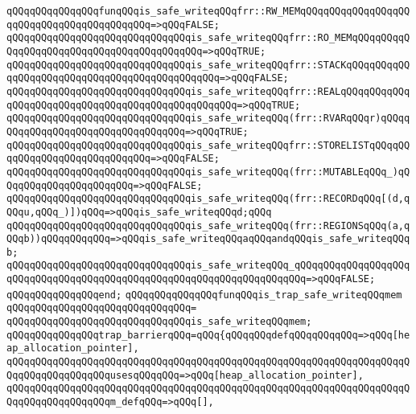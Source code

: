 \newline
\verb|qQQqqQQqqQQqqQQqfunqQQqis_safe_writeqQQqfrr::RW_MEMqQQqqQQqqQQqqQQqqQQqqQQqqQQqqQQqqQQqqQQqqQQq=>qQQqFALSE;|\newline
\verb|qQQqqQQqqQQqqQQqqQQqqQQqqQQqqQQqis_safe_writeqQQqfrr::RO_MEMqQQqqQQqqQQqqQQqqQQqqQQqqQQqqQQqqQQqqQQqqQQq=>qQQqTRUE;|\newline
\verb|qQQqqQQqqQQqqQQqqQQqqQQqqQQqqQQqis_safe_writeqQQqfrr::STACKqQQqqQQqqQQqqQQqqQQqqQQqqQQqqQQqqQQqqQQqqQQqqQQq=>qQQqFALSE;|\newline
\verb|qQQqqQQqqQQqqQQqqQQqqQQqqQQqqQQqis_safe_writeqQQqfrr::REALqQQqqQQqqQQqqQQqqQQqqQQqqQQqqQQqqQQqqQQqqQQqqQQqqQQq=>qQQqTRUE;|\newline
\verb|qQQqqQQqqQQqqQQqqQQqqQQqqQQqqQQqis_safe_writeqQQq(frr::RVARqQQqr)qQQqqQQqqQQqqQQqqQQqqQQqqQQqqQQqqQQq=>qQQqTRUE;|\newline
\verb|qQQqqQQqqQQqqQQqqQQqqQQqqQQqqQQqis_safe_writeqQQqfrr::STORELISTqQQqqQQqqQQqqQQqqQQqqQQqqQQqqQQq=>qQQqFALSE;|\newline
\verb|qQQqqQQqqQQqqQQqqQQqqQQqqQQqqQQqis_safe_writeqQQq(frr::MUTABLEqQQq_)qQQqqQQqqQQqqQQqqQQqqQQq=>qQQqFALSE;|\newline
\verb|qQQqqQQqqQQqqQQqqQQqqQQqqQQqqQQqis_safe_writeqQQq(frr::RECORDqQQq[(d,qQQqu,qQQq_)])qQQq=>qQQqis_safe_writeqQQqd;qQQq|\newline
\verb|qQQqqQQqqQQqqQQqqQQqqQQqqQQqqQQqis_safe_writeqQQq(frr::REGIONSqQQq(a,qQQqb))qQQqqQQqqQQq=>qQQqis_safe_writeqQQqaqQQqandqQQqis_safe_writeqQQqb;|\newline
\verb|qQQqqQQqqQQqqQQqqQQqqQQqqQQqqQQqis_safe_writeqQQq_qQQqqQQqqQQqqQQqqQQqqQQqqQQqqQQqqQQqqQQqqQQqqQQqqQQqqQQqqQQqqQQqqQQqqQQq=>qQQqFALSE;|\newline
\verb|qQQqqQQqqQQqqQQqend;|\newline
\newline
\verb|qQQqqQQqqQQqqQQqfunqQQqis_trap_safe_writeqQQqmem|\newline
\verb|qQQqqQQqqQQqqQQqqQQqqQQqqQQqqQQq=|\newline
\verb|qQQqqQQqqQQqqQQqqQQqqQQqqQQqqQQqis_safe_writeqQQqmem;|\newline
\newline
\verb|qQQqqQQqqQQqqQQqtrap_barrierqQQq=qQQq{qQQqqQQqdefqQQqqQQqqQQq=>qQQq[heap_allocation_pointer],|\newline
\verb|qQQqqQQqqQQqqQQqqQQqqQQqqQQqqQQqqQQqqQQqqQQqqQQqqQQqqQQqqQQqqQQqqQQqqQQqqQQqqQQqqQQqqQQqusesqQQqqQQq=>qQQq[heap_allocation_pointer],|\newline
\verb|qQQqqQQqqQQqqQQqqQQqqQQqqQQqqQQqqQQqqQQqqQQqqQQqqQQqqQQqqQQqqQQqqQQqqQQqqQQqqQQqqQQqqQQqm_defqQQq=>qQQq[],|\newline
